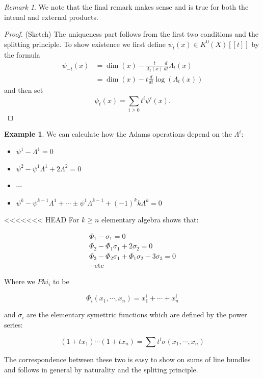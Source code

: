 \documentclass[a4paper,10pt]{article}
\theoremstyle{plain}%
\theoremstyle{definition}
\newtheorem{exmp}{Example}
\theoremstyle{remark}
\newtheorem{rem}{Remark}
\begin{document}
\begin{rem}
  We note that the final remark makes sense and is true for both the intenal
  and external products.
\end{rem}

\begin{proof}(Sketch)
The uniqueness part follows from the first two conditions and the splitting principle. To show existence we first define $\psi_t(x)\in K^0(X)[[t]]$ by the formula
\begin{align*}
\psi_{-t}(x)&= \dim(x)-\frac{t}{\Lambda_t(x)}\frac{d}{dt}\Lambda_{t}(x)\\
&= \dim(x)-t\frac{d}{dt}\log(\Lambda_{t}(x))
\end{align*}
and then set 
$$\psi_t(x)=\sum_{i\geq 0}t^i\psi^i(x).$$
\end{proof}

\begin{exmp}
We can calculate how the Adams operations depend on the $\Lambda^i$:
\begin{itemize}
\item $\psi^1-\Lambda^1=0$
\item $\psi^2-\psi^1\Lambda^1+2\Lambda^2=0$
\item $\cdots$
\item $\psi^k-\psi^{k-1}\Lambda^1+\cdots\pm\psi^1\Lambda^{k-1}+(-1)^kk\Lambda^k=0$

\end{itemize}
\end{exmp}

<<<<<<< HEAD
For $k\geq n$ elementary algebra shows that:

\begin{align*}
  \Phi_1-\sigma_1=0\\
  \Phi_2-\Phi_1\sigma_1+2\sigma_2=0\\
  \Phi_3-\Phi_2\sigma_1+\Phi_1\sigma_2-3\sigma_3=0\\
  \cdots \text{etc}
\end{align*}

Where we $Phi_i$ to be

$$\Phi_i(x_1,\cdots ,x_n)=x_1^i+\cdots +x_n^i$$

and $\sigma_i$ are the elementary symettric functions which are defined by the
power series:

$$(1+t x_1)\cdots (1+t x_n)=\sum t^i\sigma(x_1,\cdots ,x_n)$$

The correspondence between these two is easy to show on sums of line bundles and
follows in general by naturality and the spliting principle.
\end{document}
